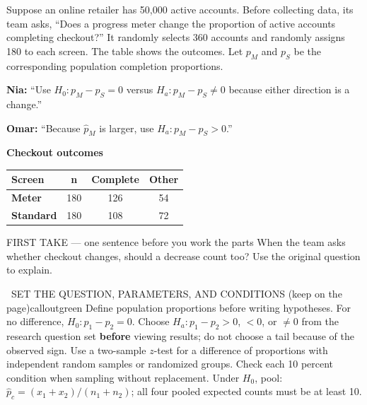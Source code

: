 \documentclass[11pt]{article}
\begin{document}


Suppose an online retailer has 50,000 active accounts. Before collecting data, its team asks, ``Does a progress meter change the proportion of active accounts completing checkout?'' It randomly selects 360 accounts and randomly assigns 180 to each screen. The table shows the outcomes. Let $p_M$ and $p_S$ be the corresponding population completion proportions.\par\smallskip \textbf{Nia:} ``Use $H_0:p_M-p_S=0$ versus $H_a:p_M-p_S\ne0$ because either direction is a change.''\par \textbf{Omar:} ``Because $\hat p_M$ is larger, use $H_a:p_M-p_S>0$.''\par
\begin{center}
\textbf{Checkout outcomes}\par\smallskip
\begin{tabular}{|l|c|c|c|}
\hline
\textbf{Screen} & \textbf{n} & \textbf{Complete} & \textbf{Other} \\ \hline
\textbf{Meter} & 180 & 126 & 54 \\ \hline
\textbf{Standard} & 180 & 108 & 72 \\ \hline
\end{tabular}
\end{center}
\begin{firsttakebox}{FIRST TAKE --- one sentence before you work the parts}
When the team asks whether checkout changes, should a decrease count too? Use the original question to explain.
\workspace{0.9in}
\end{firsttakebox}

\begin{callout}{\IconBook\ SET THE QUESTION, PARAMETERS, AND CONDITIONS (keep on the page)}{calloutgreen}
Define population proportions before writing hypotheses. For no difference,
$H_0:p_1-p_2=0$. Choose $H_a:p_1-p_2>0$, $<0$, or $\ne0$ from the research
question set \textbf{before} viewing results; do not choose a tail because of the observed sign.
Use a two-sample $z$-test for a difference of proportions with independent random samples
or randomized groups. Check each 10 percent condition when sampling without replacement.
Under $H_0$, pool: $\hat p_c=(x_1+x_2)/(n_1+n_2)$; all four pooled expected counts must be at least 10.
\end{callout}
\end{document}
